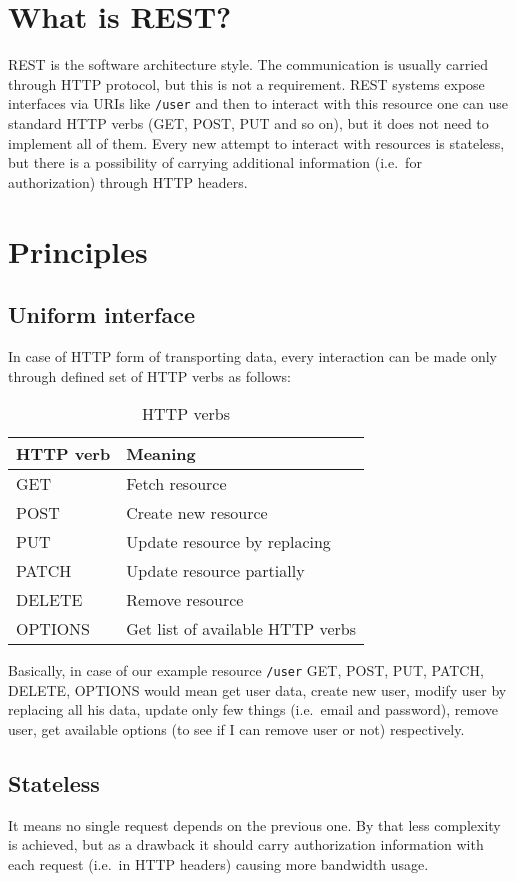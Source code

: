 \section{What is REST?}
REST is the software architecture style\cite{REST-wiki}. The communication is usually carried through HTTP protocol, but this is not a requirement. REST systems expose interfaces via URIs like\label{example-URI} \verb|/user| and then to interact with this resource one can use standard HTTP verbs (GET, POST, PUT and so on), but it does not need to implement all of them. Every new attempt to interact with resources is stateless, but there is a possibility of carrying additional information (i.e.\ for authorization) through HTTP headers.

\section{Principles}

\subsection{Uniform interface}
\label{uniform-interface}
In case of HTTP form of transporting data, every interaction can be made only through defined set of HTTP verbs as follows:

\begin{table}[!htbp]
\centering
\begin{tabular}{ll} \toprule
 HTTP verb &  Meaning \\ \midrule
 GET & Fetch resource \\
 POST & Create new resource \\
 PUT & Update resource by replacing \\
 PATCH & Update resource partially \\
 DELETE & Remove resource \\
 OPTIONS & Get list of available HTTP verbs \\ \bottomrule
\end{tabular}
\caption{HTTP verbs}
\label{tab:http-verbs}
\end{table}

Basically, in case of our example resource \verb|/user| GET, POST, PUT, PATCH, DELETE, OPTIONS would mean get user data, create new user, modify user by replacing all his data, update only few things (i.e.\ email and password), remove user, get available options (to see if I can remove user or not) respectively.

\subsection{Stateless}
\label{sec:stateless}
It means no single request depends on the previous one. By that less complexity is achieved, but as a drawback it should carry authorization information with each request (i.e.\ in HTTP headers) causing more bandwidth usage.

